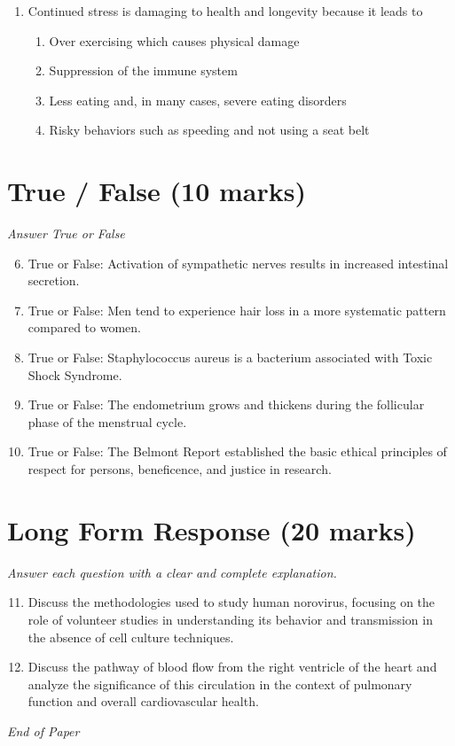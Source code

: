 \documentclass[12pt]{article}
\begin{document}
\begin{enumerate}[label=\arabic*.]
\begin{enumerate}[label=(\alph*)]
    \item Linda George and Stephen Weiler
    \item William Masters and Virginia Johnson
\end{enumerate}
\item Continued stress is damaging to health and longevity because it leads to
\begin{enumerate}[label=(\alph*)]
    \item Over exercising which causes physical damage
    \item Suppression of the immune system
    \item Less eating and, in many cases, severe eating disorders
    \item Risky behaviors such as speeding and not using a seat belt
\end{enumerate}
\end{enumerate}

\section*{True / False (10 marks)}
\textit{Answer True or False}
\begin{enumerate}[label=\arabic*.]
\setcounter{enumi}{5}
\item True or False: Activation of sympathetic nerves results in increased intestinal secretion.
\item True or False: Men tend to experience hair loss in a more systematic pattern compared to women.
\item True or False: Staphylococcus aureus is a bacterium associated with Toxic Shock Syndrome.
\item True or False: The endometrium grows and thickens during the follicular phase of the menstrual cycle.
\item True or False: The Belmont Report established the basic ethical principles of respect for persons, beneficence, and justice in research.
\end{enumerate}

\section*{Long Form Response (20 marks)}
\textit{Answer each question with a clear and complete explanation.}
\begin{enumerate}[label=\arabic*.]
\setcounter{enumi}{10}
\item Discuss the methodologies used to study human norovirus, focusing on the role of volunteer studies in understanding its behavior and transmission in the absence of cell culture techniques.
\item Discuss the pathway of blood flow from the right ventricle of the heart and analyze the significance of this circulation in the context of pulmonary function and overall cardiovascular health.
\end{enumerate}

\vfill
\noindent\textit{End of Paper}
\end{document}
